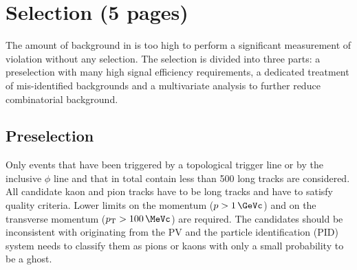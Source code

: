
\section{Selection (5 pages)}
\label{sec:b02dd:selection}

The amount of background in \BdToDD is too high to perform a significant
measurement of \CP violation without any selection. The selection is divided
into three parts: a preselection with many high signal efficiency
requirements, a dedicated treatment of mis-identified backgrounds and a
multivariate analysis to further reduce combinatorial background.

\subsection{Preselection}
\label{sec:b02dd:selection:cuts}

Only events that have been triggered by a topological trigger line or by the
inclusive $\phi$ line and that in total contain less than \num{500} long
tracks are considered. All candidate kaon and pion tracks have to be long
tracks and have to satisfy quality criteria. Lower limits on the momentum ($p
> \SI{1}{\GeVc}$) and on the transverse momentum ($\pT > \SI{100}{\MeVc}$) are
required. The candidates should be inconsistent with originating from the PV
and the particle identification (PID) system needs to classify them as pions
or kaons with only a small probability to be a ghost.

